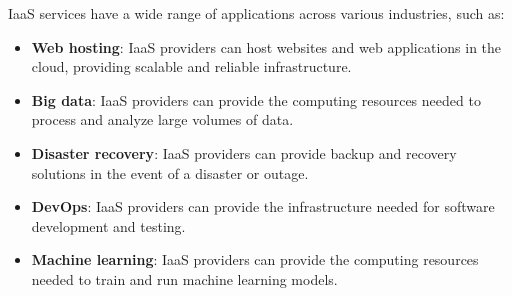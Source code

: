 \documentclass[../main.tex]{subfiles}
\begin{document}
IaaS services have a wide range of applications across various industries, such as:
\begin{itemize}
    \item \textbf{Web hosting}: IaaS providers can host websites and web applications in the cloud, providing scalable and reliable infrastructure.
    \item \textbf{Big data}: IaaS providers can provide the computing resources needed to process and analyze large volumes of data.
    \item \textbf{Disaster recovery}: IaaS providers can provide backup and recovery solutions in the event of a disaster or outage.
    \item \textbf{DevOps}: IaaS providers can provide the infrastructure needed for software development and testing.
    \item \textbf{Machine learning}: IaaS providers can provide the computing resources needed to train and run machine learning models.
\end{itemize}
\end{document}
